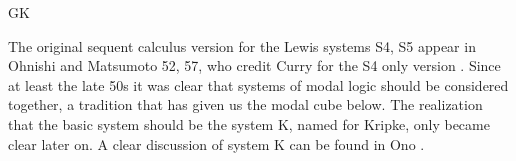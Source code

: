 \begin{entry}{GK}
\begin{history}
The original sequent calculus version for the Lewis systems S4, S5
appear in Ohnishi and Matsumoto 52, 57, who credit Curry for the S4
only version \cite{Ohnishi:1957,Ohnishi:1959}. Since at least the late
50s it was clear that systems of modal logic should be considered
together, a tradition that has given us the modal cube below. The
realization that the basic system should be the system K, named for
Kripke, only became clear later on. A clear discussion of system K can
be found in Ono \cite{Ono:1998}.
\end{history}


%
%
%
%
%
%
% 
%












\end{entry}
